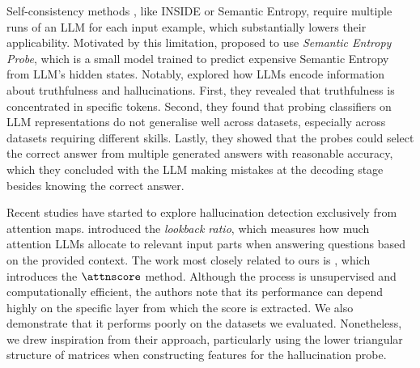 Self-consistency methods \citep{liang_internal_2024}, like INSIDE or Semantic Entropy, require multiple runs of an LLM for each input example, which substantially lowers their applicability. Motivated by this limitation, \citep{kossen_semantic_2024} proposed to use \textit{Semantic Entropy Probe}, which is a small model trained to predict expensive Semantic Entropy \citep{farquhar_detecting_2024} from LLM's hidden states. Notably, \citep{orgad_llms_2025} explored how LLMs encode information about truthfulness and hallucinations. First, they revealed that truthfulness is concentrated in specific tokens. Second, they found that probing classifiers on LLM representations do not generalise well across datasets, especially across datasets requiring different skills. Lastly, they showed that the probes could select the correct answer from multiple generated answers with reasonable accuracy, which they concluded with the LLM making mistakes at the decoding stage besides knowing the correct answer.

Recent studies have started to explore hallucination detection exclusively from attention maps. \citep{chuang_lookback_2024} introduced the \textit{lookback ratio}, which measures how much attention LLMs allocate to relevant input parts when answering questions based on the provided context. The work most closely related to ours is \citep{sriramanan_llm-check_2024}, which introduces the $\attnscore$ method. Although the process is unsupervised and computationally efficient, the authors note that its performance can depend highly on the specific layer from which the score is extracted. We also demonstrate that it performs poorly on the datasets we evaluated. Nonetheless, we drew inspiration from their approach, particularly using the lower triangular structure of matrices when constructing features for the hallucination probe.